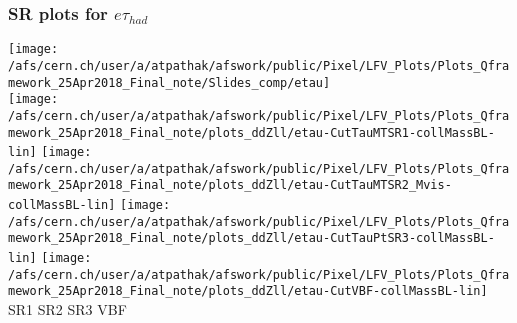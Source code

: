 \documentclass{beamer}
\begin{document}
\begin{frame}
\frametitle{SR plots for $e\tau_{had}$}
\begin{normalsize}
\vspace*{0.2cm}
\texttt{[image: /afs/cern.ch/user/a/atpathak/afswork/public/Pixel/LFV\_Plots/Plots\_Qframework\_25Apr2018\_Final\_note/Slides\_comp/etau]}\\
\texttt{[image: /afs/cern.ch/user/a/atpathak/afswork/public/Pixel/LFV\_Plots/Plots\_Qframework\_25Apr2018\_Final\_note/plots\_ddZll/etau-CutTauMTSR1-collMassBL-lin]}
\texttt{[image: /afs/cern.ch/user/a/atpathak/afswork/public/Pixel/LFV\_Plots/Plots\_Qframework\_25Apr2018\_Final\_note/plots\_ddZll/etau-CutTauMTSR2\_Mvis-collMassBL-lin]}
\texttt{[image: /afs/cern.ch/user/a/atpathak/afswork/public/Pixel/LFV\_Plots/Plots\_Qframework\_25Apr2018\_Final\_note/plots\_ddZll/etau-CutTauPtSR3-collMassBL-lin]}
\texttt{[image: /afs/cern.ch/user/a/atpathak/afswork/public/Pixel/LFV\_Plots/Plots\_Qframework\_25Apr2018\_Final\_note/plots\_ddZll/etau-CutVBF-collMassBL-lin]}\\
\hspace{0.5in}SR1 
\hspace{0.75in}SR2
\hspace{0.75in}SR3
\hspace{0.75in}VBF
\end{normalsize}
\end{frame}
\end{document}
